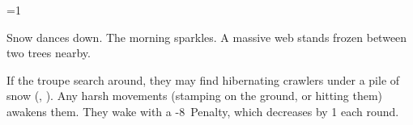 \ifnum\value{cycle}=1

\begin{boxtext}
  Snow dances down.
  The morning sparkles.
  A massive web stands frozen between two trees nearby.
\end{boxtext}

If the troupe search around, they may find  hibernating \glspl{crawler} under a pile of snow (, \tn[10]).
Any harsh movements (stamping on the ground, or hitting them) awakens them.
They wake with a -8~Penalty, which decreases by 1 each \gls{round}.


\fi
